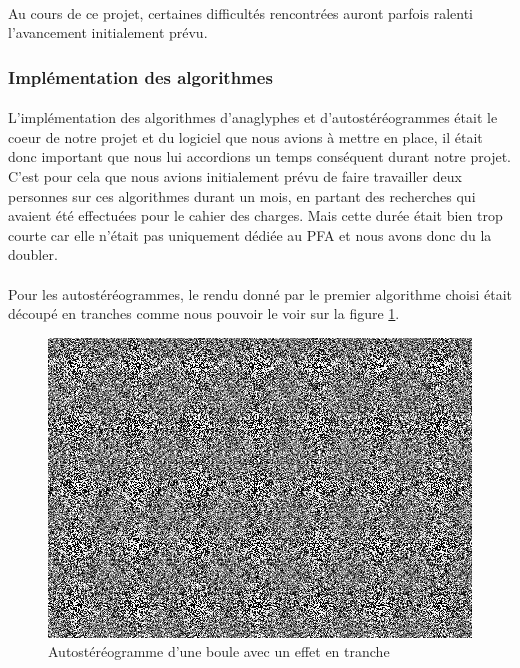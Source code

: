 \paragraph{}
Au cours de ce projet, certaines difficultés rencontrées auront parfois ralenti l'avancement initialement prévu.

\subsubsection{Implémentation des algorithmes}
\paragraph{}
L'implémentation des algorithmes d'anaglyphes et d'autostéréogrammes était le coeur de notre projet et du logiciel que nous avions à mettre en place, il était donc important que nous lui accordions un temps conséquent durant notre projet. C'est pour cela que nous avions initialement prévu de faire travailler deux personnes sur ces algorithmes durant un mois, en partant des recherches qui avaient été effectuées pour le cahier des charges. Mais cette durée était bien trop courte car elle n'était  pas uniquement dédiée au PFA et nous avons donc du la doubler.

\paragraph{}
Pour les autostéréogrammes, le rendu donné par le premier algorithme choisi était découpé en tranches comme nous pouvoir le voir sur la figure \ref{fig:sphAutoste}.

\begin{figure}[h]               
	\centering      
	\includegraphics[scale=0.7]{bouleAutoste.png}
	\caption{\label{fig:sphAutoste} Autostéréogramme d'une boule avec un effet en tranche \protect}
\end{figure}


